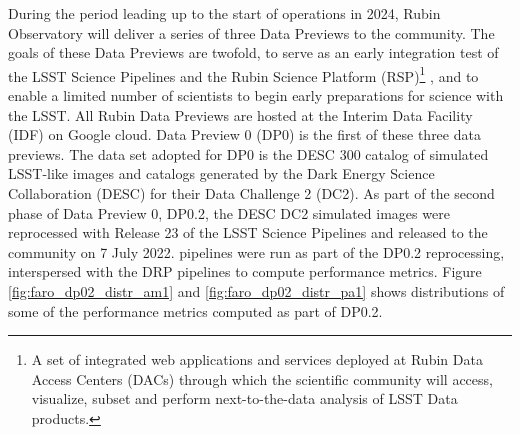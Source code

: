 During the period leading up to the start of operations in 2024, Rubin Observatory will deliver a series of three Data Previews to the community. 
The goals of these Data Previews are twofold, to serve as an early integration test of the LSST Science Pipelines and the Rubin Science Platform (RSP)\footnote{A set of integrated web applications and services deployed at Rubin Data Access Centers (DACs) through which the scientific community will access, visualize, subset and perform next-to-the-data analysis of LSST Data products.} \cite{lse-319}, and to enable a limited number of scientists to begin early preparations for science with the LSST.
All  Rubin Data Previews are hosted at the Interim Data Facility (IDF) on Google cloud\cite{2021arXiv211115030O}.
Data Preview 0 (DP0) \cite{RTN-001} is the first of these three data previews.
The data set adopted for DP0 is the DESC 300 \degsq catalog of simulated LSST-like images and catalogs generated by the Dark Energy Science Collaboration (DESC) for their Data Challenge 2 (DC2)\cite{2021ApJS..253...31L}.
As part of the second phase of Data Preview 0, DP0.2, the DESC DC2 simulated images were reprocessed with Release 23 of the LSST Science Pipelines and released to the community on 7 July 2022.
\faro pipelines were run as part of the DP0.2 reprocessing, interspersed with the DRP pipelines to compute performance metrics. 
Figure \ref{fig:faro_dp02_distr_am1} and   \ref{fig:faro_dp02_distr_pa1} shows distributions of some of the performance metrics computed as part of DP0.2.
